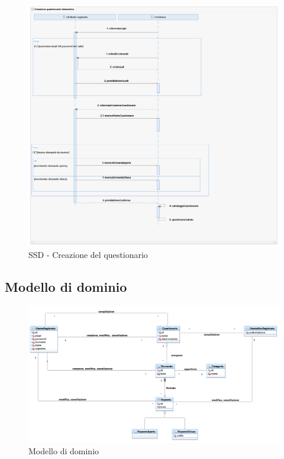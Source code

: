 \documentclass[12pt]{article}
\begin{document}
\begin{figure}[H]
\includegraphics[scale=0.5, left]{UNIMIBModule_CreazionequestionarioSequenceDiagram.png}
\caption{SSD - Creazione del questionario}
\end{figure}



\subsection{Modello di dominio}
\begin{figure}[H]
\includegraphics[scale=0.5, left]{UNIMIBModule_UniMiBModuleDomainLayer.png}
\caption{Modello di dominio}
\end{figure}
\end{document}
